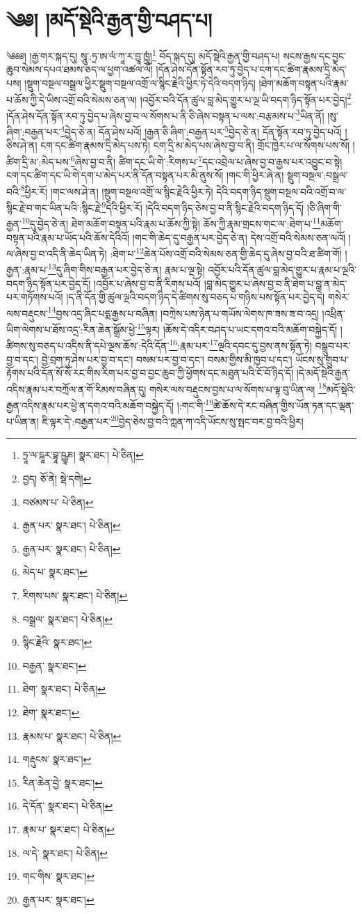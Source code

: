 \setcounter{footnote}{0} 
\chapter{༄༅། །མདོ་སྡེའི་རྒྱན་གྱི་བཤད་པ།}༄༅༅། །རྒྱ་གར་སྐད་དུ། སཱུ་:ཏྲ་ཨ་ལཾ་ཀཱ་ར་བྱཱ་ཁྱཱཾ།\footnote{ཏྲཱ་ལ་ངྐཱར་བྷཱ་ཥྱཱཎ།  སྣར་ཐང་།  པེ་ཅིན། } བོད་སྐད་དུ། མདོ་སྡེའི་རྒྱན་གྱི་བཤད་པ། སངས་རྒྱས་དང་བྱང་ཆུབ་སེམས་དཔའ་ཐམས་ཅད་ལ་ཕྱག་འཚལ་ལོ། །དོན་ཤེས་དོན་སྟོན་རབ་ཏུ་བྱེད་པ་ངག་དང་ཚིག་རྣམས་དྲི་མེད་པས། །སྡུག་བསྔལ་བསྒྲལ་ཕྱིར་སྡུག་བསྔལ་འགྲོ་ལ་སྙིང་རྗེའི་ཕྱིར་ཏེ་དེའི་བདག་ཉིད། །ཐེག་མཆོག་བསྟན་པའི་རྣམ་པ་ཆོས་ཀྱི་དེ་ཡིས་འགྲོ་བའི་སེམས་ཅན་ལ། །འབྱོར་བའི་དོན་ཚུལ་བླ་མེད་གྱུར་པ་ལྔ་ཡི་བདག་ཉིད་སྟོན་པར་བྱེད།\footnote{བྱད།  ཅོ་ནེ།  སྡེ་དགེ། } །དོན་ཤེས་དོན་སྟོན་རབ་ཏུ་བྱེད་པ་ཞེས་བྱ་བ་ལ་སོགས་པ་ནི་ཅི་ཞེས་བསྟན་པ་ལས་:བརྩམས་པ་\footnote{བཙམས་པ་  པེ་ཅིན། }ཡིན་ནོ། །སུ་ཞིག་:བརྒྱན་པར་\footnote{རྒྱན་པར་  སྣར་ཐང་།  པེ་ཅིན། }བྱེད་ཅེ་ན། དོན་ཤེས་པའོ། །རྒྱན་ཅི་ཞིག་:བརྒྱན་པར་\footnote{རྒྱན་པར་  སྣར་ཐང་།  པེ་ཅིན། }བྱེད་ཅེ་ན། དོན་སྟོན་རབ་ཏུ་བྱེད་པའོ། །ཅིས་ཤེ་ན། ངག་དང་ཚིག་རྣམས་དྲི་མེད་པས་ཏེ། ངག་དྲི་མ་མེད་པས་ཞེས་བྱ་བ་ནི། གྲོང་ཁྱེར་པ་ལ་སོགས་པས་སོ། །ཚིག་དྲི་མ་:མེད་པས་\footnote{མེད་པ་  སྣར་ཐང་། }ཞེས་བྱ་བ་ནི། ཚིག་དང་ཡི་གེ་:རིགས་པ་\footnote{རིགས་པས་  སྣར་ཐང་།  པེ་ཅིན། }དང་འབྲེལ་པ་ཞེས་བྱ་བ་རྒྱས་པར་འབྱུང་བ་སྟེ། ངག་དང་ཚིག་དང་ཡི་གེ་དག་པ་མེད་པར་ནི་དོན་བསྟན་པར་མི་ནུས་སོ། །གང་གི་ཕྱིར་ཞེ་ན། སྡུག་བསྔལ་:བསྒྲལ་བའི་\footnote{བསྒྲལ་  སྣར་ཐང་།  པེ་ཅིན། }ཕྱིར་རོ། །གང་ལས་ཤེ་ན། །སྡུག་བསྔལ་འགྲོ་ལ་སྙིང་རྗེའི་ཕྱིར་ཏེ། དེའི་བདག་ཉིད་སྡུག་བསྔལ་བའི་འགྲོ་བ་ལ་སྙིང་རྗེ་བ་གང་ཡིན་པའི་:སྙིང་རྗེ་\footnote{སྙིང་རྗེའི་  སྣར་ཐང་། }དེའི་ཕྱིར་རོ། །དེའི་བདག་ཉིད་ཅེས་བྱ་བ་ནི་སྙིང་རྗེའི་བདག་ཉིད་དོ། །ཅི་ཞིག་གི་རྒྱན་\footnote{བརྒྱན་  སྣར་ཐང་། }དུ་བྱེད་ཅེ་ན། ཐེག་མཆོག་བསྟན་པའི་རྣམ་པ་ཆོས་ཀྱི་སྟེ། ཆོས་ཀྱི་རྣམ་གྲངས་གང་ལ་:ཐེག་པ་\footnote{ཐེག་  སྣར་ཐང་།  པེ་ཅིན། }མཆོག་བསྟན་པའི་རྣམ་པ་ཡོད་པའི་ཆོས་དེའིའོ། །གང་གི་ཆེད་དུ་བརྒྱན་པར་བྱེད་ཅེ་ན། དེས་འགྲོ་བའི་སེམས་ཅན་ལའོ། །ལ་ཞེས་བྱ་བ་འདི་ནི་ཆེད་ཡིན་ཏེ། :ཐེག་པ་\footnote{ཐེག་  སྣར་ཐང་། }ཆེན་པོས་འགྲོ་བའི་སེམས་ཅན་གྱི་ཆེད་དུ་ཞེས་བྱ་བའི་ཐ་ཚིག་གོ། །རྒྱན་:རྣམ་པ་\footnote{རྣམས་པ་  སྣར་ཐང་།  པེ་ཅིན། }དུ་ཞིག་གིས་བརྒྱན་པར་བྱེད་ཅེ་ན། རྣམ་པ་ལྔ་སྟེ། འབྱོར་པའི་དོན་ཚུལ་བླ་མེད་གྱུར་པ་རྣམ་པ་ལྔའི་བདག་ཉིད་སྟོན་པར་བྱེད་དོ། །འབྱོར་པ་ཞེས་བྱ་བ་ནི་རིགས་པའོ། །བླ་མེད་གྱུར་པ་ཞེས་བྱ་བ་ནི་ཐེག་པ་བླ་ན་མེད་པར་གཏོགས་པའོ། །ད་ནི་དོན་གྱི་ཚུལ་ལྔའི་བདག་ཉིད་དེ་ཚིགས་སུ་བཅད་པ་གཉིས་པས་སྟོན་པར་བྱེད་དེ། གསེར་ལས་བརྡུངས་\footnote{གརྡུངས་  སྣར་ཐང་། }བྱས་འདྲ་ཞིང་པདྨ་རྒྱས་པ་བཞིན། །བཀྲེས་པས་ཉེན་པ་གཡོས་ལེགས་ཁ་ཟས་ཟ་བ་འདྲ། །འཕྲིན་ཡིག་ལེགས་པ་ཐོས་འདྲ་:རིན་ཆེན་སྒྲོམ་ཕྱེ་\footnote{རིན་ཆེན་བྱེ་  སྣར་ཐང་། }ལྟར། །ཆོས་དེ་འདིར་བཤད་པ་ཡང་དགའ་བའི་མཆོག་བསྐྱེད་དོ། །ཚིགས་སུ་བཅད་པ་འདིས་ནི་དཔེ་ལྔས་ཆོས་:དེའི་དོན་\footnote{དེ་དོན་  སྣར་ཐང་།  པེ་ཅིན། }:རྣམ་པར་\footnote{རྣམ་པ་  སྣར་ཐང་།  པེ་ཅིན། }ལྔའི་དབང་དུ་བྱས་ནས་སྟོན་ཏེ། བསྒྲུབ་པར་བྱ་བ་དང་། བྱེ་བྲག་ཏུ་ཤེས་པར་བྱ་བ་དང་། བསམ་པར་བྱ་བ་དང་། བསམ་གྱིས་མི་ཁྱབ་པ་དང་། ཡོངས་སུ་གྲུབ་པ་རྟོགས་པའི་དོན་སོ་སོ་རང་གིས་རིག་པར་བྱ་བ་བྱང་ཆུབ་ཀྱི་ཕྱོགས་དང་མཐུན་པའི་ངོ་བོ་ཉིད་དོ། །དེ་མདོ་སྡེའི་རྒྱན་འདིས་རྣམ་པར་བཀྲོལ་ན་གོ་རིམས་བཞིན་དུ། གསེར་ལས་བརྡུངས་བྱས་པ་ལ་སོགས་པ་ལྟ་བུ་ཡིན་ལ། \footnote{ལ་དེ་  སྣར་ཐང་།  པེ་ཅིན། }མདོ་སྡེའི་རྒྱན་འདིས་རྣམ་པར་ཕྱེ་ན་དགའ་བའི་མཆོག་བསྐྱེད་དོ། །:གང་གི་\footnote{གང་གིས་  སྣར་ཐང་། }ཚེ་ཆོས་དེ་རང་བཞིན་གྱིས་ཡོན་ཏན་དང་ལྡན་པ་ཡིན་ན། ཇི་ལྟར་དེ་:བརྒྱན་པར་\footnote{རྒྱན་པར་  སྣར་ཐང་། }བྱེད་ཅེས་བྱ་བའི་ཀླན་ཀ་འདི་ཡོངས་སུ་སྤང་བར་བྱ་བའི་ཕྱིར། 